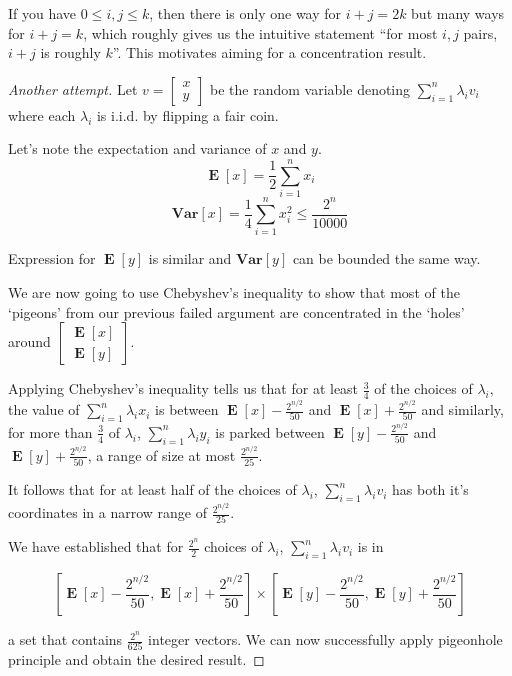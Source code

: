 \documentclass[oneside,11pt]{scrbook}
\theoremstyle{plain}
\theoremstyle{definition}
\theoremstyle{remark}
\DeclareMathOperator*{\E}{\textbf{E}}
\newcommand{\Var}{\textbf{Var}}
\begin{document}
If you have $0\leq i,j\leq k$, then there is only one way for $i+j=2k$ but many ways
for $i+j=k$, which roughly gives us the intuitive statement ``for most $i,j$ pairs,
$i+j$ is roughly $k$''. This motivates aiming for a concentration result.

\begin{proof}[Another attempt]
Let $v=\begin{bmatrix}x\\y\end{bmatrix}$ be the random variable
denoting $\sum_{i=1}^n\lambda_i v_i$ where each $\lambda_i$ is i.i.d. by flipping a
fair coin.

Let's note the expectation and variance of $x$ and $y$.
\[\E[x] = \frac{1}{2}\sum_{i=1}^nx_i\]
\[
\Var[x] = \frac{1}{4}\sum_{i=1}^n x_i^2 \leq
\frac{2^n}{10000}
\]

Expression for $\E[y]$ is similar and $\Var[y]$ can be bounded the same way.

We are now going to use Chebyshev's inequality to show that most of the `pigeons'
from our previous failed argument are concentrated in the `holes' around
$\begin{bmatrix}\E[x]\\\E[y]\end{bmatrix}$.

Applying Chebyshev's inequality tells us that for at least $\frac{3}{4}$ of the
choices of $\lambda_i$, the value of $\sum_{i=1}^n \lambda_ix_i$ is between $\E[x]-
\frac{2^{n/2}}{50}$ and $\E[x]+\frac{2^{n/2}}{50}$ and similarly, for more than
$\frac{3}{4}$ of $\lambda_i$, $\sum_{i=1}^n \lambda_i y_i$ is parked between $\E[y]-
\frac{2^{n/2}}{50}$ and $\E[y]+\frac{2^{n/2}}{50}$, a range of size at most
$\frac{2^{n/2}}{25}$.

It follows that for at least half of the choices of $\lambda_i$, $\sum_{i=1}^n
\lambda_i v_i$ has both it's coordinates in a narrow range of $\frac{2^{n/2}}{25}$.

We have established that for $\frac{2^n}{2}$ choices of $\lambda_i$,
$\sum_{i=1}^n\lambda_i v_i$ is in

\[\left[\E[x]-\frac{2^{n/2}}{50},
\E[x]+\frac{2^{n/2}}{50}\right]\times\left[\E[y]-\frac{2^{n/2}}{50},
\E[y]+\frac{2^{n/2}}{50}\right]\]

a set that contains $\frac{2^n}{625}$ integer vectors. We can now successfully apply
pigeonhole principle and obtain the desired result.

\end{proof}
\end{document}
